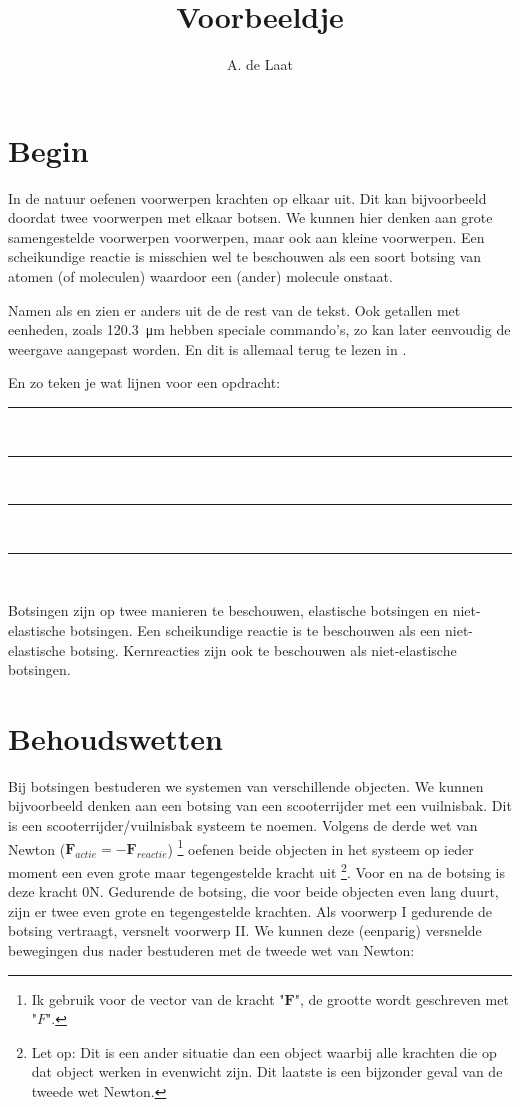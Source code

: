 



\title{Voorbeeldje}
\author{A. de Laat}
\date{}

\maketitle

\section{Begin}

In de natuur oefenen voorwerpen krachten op elkaar uit. Dit kan bijvoorbeeld
doordat twee voorwerpen met elkaar botsen. We kunnen hier denken aan
grote samengestelde voorwerpen voorwerpen, maar ook aan kleine voorwerpen.
Een scheikundige reactie is misschien wel te beschouwen als een soort
botsing van atomen (of moleculen) waardoor een (ander) molecule onstaat.

Namen als \hisparc en \jsparc zien er anders uit de de rest van de tekst.
Ook getallen met eenheden, zoals \SI{120.3}{\micro\meter} hebben speciale
commando's, zo kan later eenvoudig de weergave aangepast worden. En dit
is allemaal terug te lezen in \cite{tekst}.

En zo teken je wat lijnen voor een opdracht:

\begin{center}
    \rule{\textwidth}{0.3mm}\\
    \rule{\textwidth}{0.3mm}\\
    \rule{\textwidth}{0.3mm}\\
    \rule{\textwidth}{0.3mm}\\
\end{center}

Botsingen zijn op twee manieren te beschouwen, elastische botsingen
en niet-elastische botsingen. Een scheikundige reactie is te beschouwen
als een niet-elastische botsing. Kernreacties zijn ook te beschouwen
als niet-elastische botsingen.


\section{Behoudswetten}

Bij botsingen bestuderen we systemen van verschillende objecten. We
kunnen bij\-voorbeeld denken aan een botsing van een scooterrijder met
een vuilnisbak. Dit is een scooterrijder/vuilnisbak systeem te noemen.
Volgens de derde wet van Newton
($\mathbf{F}_{actie}=-\mathbf{F}_{reactie}$) \footnote{Ik gebruik voor
de vector van de kracht "$\mathbf{F}$", de grootte wordt geschreven met
"$F$".} oefenen beide objecten in het systeem op ieder moment een even
grote maar tegengestelde kracht uit \footnote{Let op: Dit is een ander
situatie dan een object waarbij alle krachten die op dat object werken
in evenwicht zijn. Dit laatste is een bijzonder geval van de tweede wet
Newton.}. Voor en na de botsing is deze kracht 0N. Gedurende de botsing,
die voor beide objecten even lang duurt, zijn er twee even grote en
tegengestelde krachten. Als voorwerp I gedurende de botsing vertraagt,
versnelt voorwerp II. We kunnen deze (eenparig) versnelde bewegingen dus
nader bestuderen met de tweede wet van Newton:

